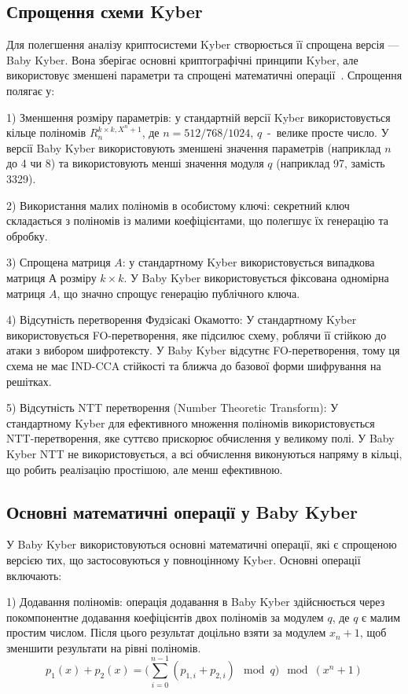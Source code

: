 \subsection*{Спрощення схеми Kyber}

Для полегшення аналізу криптосистеми Kyber створюється її спрощена версія — Baby Kyber. Вона зберігає основні криптографічні принципи Kyber, але використовує зменшені параметри та спрощені математичні операції~\cite{babyKyber}. Спрощення полягає у: 

1) Зменшення розміру параметрів: у стандартній версії Kyber використовується кільце поліномів ${R}_{n}^{k \times k, X^{n}+1}$, де $n = 512/768/1024$, $q$~-~велике просте число. У версії Baby Kyber використовують зменшені значення параметрів (наприклад $n$ до 4 чи 8) та використовують менші значення модуля $q$ (наприклад 97, замість 3329).

2) Використання малих поліномів в особистому ключі: секретний ключ складається з поліномів із малими коефіцієнтами, що полегшує їх генерацію та обробку.

3) Спрощена матриця $A$: у стандартному Kyber використовується випадкова матриця А розміру $k\times k$. У Baby Kyber використовується фіксована одномірна матриця $A$, що значно спрощує генерацію публічного ключа.

4) Відсутність перетворення Фудзісакі Окамотто: У стандартному Kyber використовується FO-перетворення, яке підсилює схему, роблячи її стійкою до атаки з вибором шифротексту. У Baby Kyber відсутнє FO-перетворення, тому ця схема не має IND-CCA стійкості та ближча до базової форми шифрування на решітках.

5) Відсутність NTT перетворення (Number Theoretic Transform): У стандартному Kyber для ефективного множення поліномів використовується NTT-перетворення, яке суттєво прискорює обчислення у великому полі. У Baby Kyber NTT не використовується, а всі обчислення виконуються напряму в кільці, що робить реалізацію простішою, але менш ефективною.

\subsection*{Основні математичні операції у Baby Kyber}
У Baby Kyber використовуються основні математичні операції, які є спрощеною версією тих, що застосовуються у повноцінному Kyber. Основні операції включають:

1) Додавання поліномів: операція додавання в Baby Kyber здійснюється через покомпонентне додавання коефіцієнтів двох поліномів за модулем $q$, де $q$ є малим простим числом. Після цього результат доцільно взяти за модулем $x_n + 1$, щоб зменшити результати на рівні поліномів.
$$p_1(x)+p_2(x) = \big(\sum^{n-1}_{i=0}(p_{1,i}+p_{2,i}) \mod q\big) \mod (x^n+1)$$

